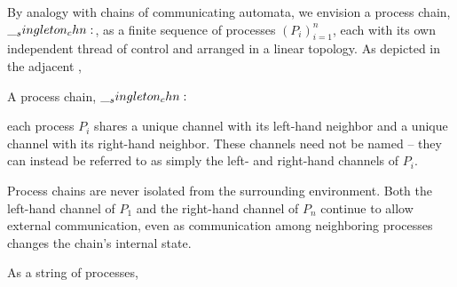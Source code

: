 By analogy with chains of communicating automata, we envision a process chain, $\__singleton_chn:$, as a finite sequence of processes $(P_i)_{i=1}^{n}$, each with its own independent thread of control and arranged in a linear topology.
As depicted in the adjacent ,%
%
\begin{marginfigure}
  \centering
  \caption{A process chain, $\__singleton_chn:$}\label{fig:singleton-processes:chain-topology}
\end{marginfigure}
%
each process $P_i$ shares a unique channel with its left-hand neighbor and a unique channel with its right-hand neighbor.
These channels need not be named -- they can instead be referred to as simply the left- and right-hand channels of $P_i$.

Process chains are never isolated from the surrounding environment.
Both the left-hand channel of $P_1$ and the right-hand channel of $P_n$ continue to allow external communication, even as communication among neighboring processes changes the chain's internal state.


As a string of processes, 

